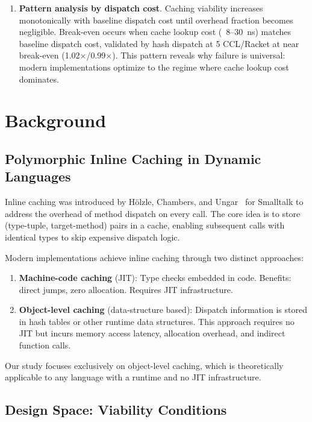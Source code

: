 \documentclass[sigplan,final,acmsmall,review,screen]{acmart}
\begin{document}
\begin{enumerate}
  \item \textbf{Pattern analysis by dispatch cost}. Caching viability increases monotonically with baseline dispatch cost until overhead fraction becomes
    negligible. Break-even occurs when cache lookup cost (~8--30~ns) matches baseline dispatch cost, validated by hash dispatch at 5%
    CCL/Racket at near break-even (1.02×/0.99×). This pattern reveals why failure is universal: modern implementations optimize to the regime
    where cache lookup cost dominates.
\end{enumerate}

\section{Background}

\subsection{Polymorphic Inline Caching in Dynamic Languages}

Inline caching was introduced by Hölzle, Chambers, and Ungar~\cite{hoelzle1991optimizing}
for Smalltalk to address the overhead of method dispatch on every call. The core idea is to
store (type-tuple, target-method) pairs in a cache, enabling subsequent calls with identical
types to skip expensive dispatch logic.

Modern implementations achieve inline caching through two distinct approaches:

\begin{enumerate}
  \item \textbf{Machine-code caching} (JIT): Type checks embedded in code. Benefits: direct
    jumps, zero allocation. Requires JIT infrastructure.

  \item \textbf{Object-level caching} (data-structure based): Dispatch information is stored
    in hash tables or other runtime data structures. This approach requires no JIT but incurs
    memory access latency, allocation overhead, and indirect function calls.
\end{enumerate}

Our study focuses exclusively on object-level caching, which is theoretically applicable to any
language with a runtime and no JIT infrastructure.

\subsection{Design Space: Viability Conditions}
\end{document}
